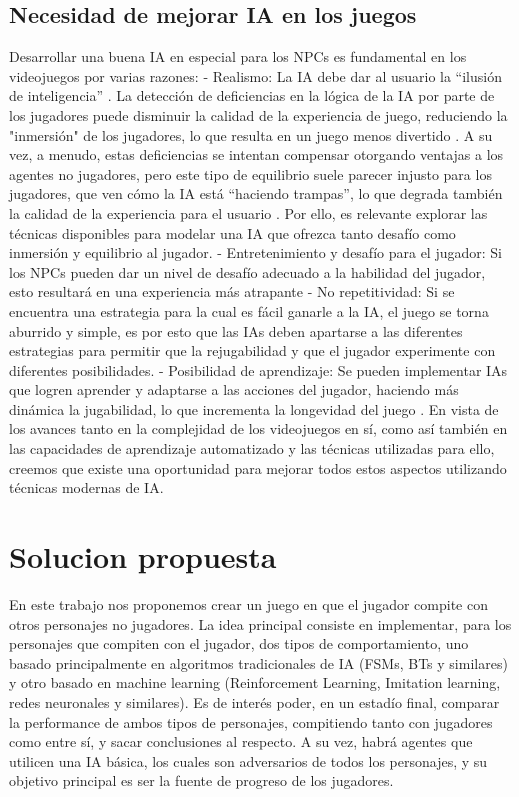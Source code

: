 \documentclass{article}
\begin{document}
\subsection{Necesidad de mejorar IA en los juegos}
Desarrollar una buena IA en especial para los NPCs es fundamental en los videojuegos por varias razones:
-	Realismo: La IA debe dar al usuario la “ilusión de inteligencia” \cite{programming_game_ai_by_example}\cite{unity_artificial_intelligence_programming}. La detección de deficiencias en la lógica de la IA por parte de los jugadores puede disminuir la calidad de la experiencia de juego, reduciendo la "inmersión" de los jugadores, lo que resulta en un juego menos divertido \cite{programming_game_ai_by_example}. A su vez,  a menudo, estas deficiencias se intentan compensar otorgando ventajas a los agentes no jugadores, pero este tipo de equilibrio suele parecer injusto para los jugadores, que ven cómo la IA está “haciendo trampas”, lo que degrada también la calidad de la experiencia para el usuario \cite{programming_game_ai_by_example}. Por ello, es relevante explorar las técnicas disponibles para modelar una IA que ofrezca tanto desafío como inmersión y equilibrio al jugador.
-	Entretenimiento y desafío para el jugador: Si los NPCs pueden dar un nivel de desafío adecuado a la habilidad del jugador, esto resultará en una experiencia más atrapante \cite{artificial_intelligence_for_video_game_visualization}
-	No repetitividad: Si se encuentra una estrategia para la cual es fácil ganarle a la IA, el juego se torna aburrido y simple, es por esto que las IAs deben apartarse a las diferentes estrategias para permitir que la rejugabilidad y que el jugador experimente con diferentes posibilidades.
-	Posibilidad de aprendizaje: Se pueden implementar IAs que logren aprender y adaptarse a las acciones del jugador, haciendo más dinámica la jugabilidad, lo que incrementa la longevidad del juego \cite{an_adaptive_game_ai_architecture}\cite{artificial_intelligence_for_video_game_visualization}.
En vista de los avances tanto en la complejidad de los videojuegos en sí, como así también en las capacidades de aprendizaje automatizado y las técnicas utilizadas para ello, creemos que existe una oportunidad para mejorar todos estos aspectos utilizando técnicas modernas de IA.

\section{Solucion propuesta}
En este trabajo nos proponemos crear un juego en que el jugador compite con otros personajes no jugadores. La idea principal consiste en implementar, para los personajes que compiten con el jugador, dos tipos de comportamiento, uno basado principalmente en algoritmos tradicionales de IA (FSMs, BTs y similares) y otro basado en machine learning (Reinforcement Learning, Imitation learning, redes neuronales y similares). Es de interés poder, en un estadío final, comparar la performance de ambos tipos de personajes, compitiendo tanto con jugadores como entre sí, y sacar conclusiones al respecto.
A su vez, habrá agentes que utilicen una IA básica, los cuales son adversarios de todos los personajes,
y su objetivo principal es ser la fuente de progreso de los jugadores.
\end{document}
